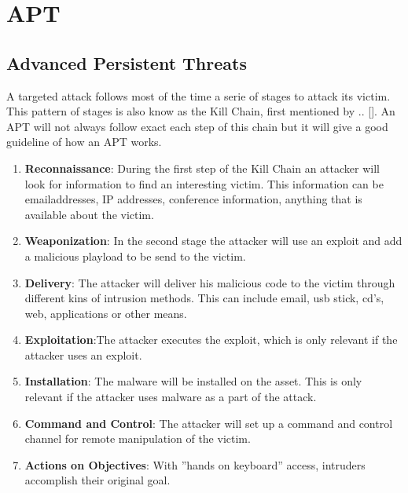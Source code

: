 \chapter{APT}
\label{cha:7}



\section{Advanced Persistent Threats}

A targeted attack follows most of the time a serie of stages to attack its victim. This pattern of stages is also know as the Kill Chain, first mentioned by .. []. An APT will not always follow exact each step of this chain but it will give a good guideline of how an APT works. 
\begin{enumerate}
\item \textbf{Reconnaissance}: During the first step of the Kill Chain an attacker will look for information to find an interesting victim. This information can be emailaddresses, IP addresses, conference information, anything that is available about the victim.
\item \textbf{Weaponization}: In the second stage the attacker will use an exploit and add a malicious playload to be send to the victim. 
\item \textbf{Delivery}: The attacker will deliver his malicious code to the victim through different kins of intrusion methods. This can include email, usb stick, cd's, web, applications or other means.
\item \textbf{Exploitation}:The attacker executes the exploit, which is only relevant if the attacker uses an exploit.
\item \textbf{Installation}: The malware will be installed on the asset. This is only relevant if the attacker uses malware as a part of the attack.
\item \textbf{Command and Control}: The attacker will set up a command and control channel for remote manipulation of the victim.
\item \textbf{Actions on Objectives}: With ''hands on keyboard'' access, intruders accomplish their original goal. 
\end{enumerate}

